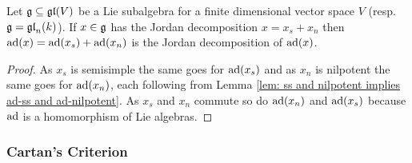 \begin{cor}\label{cor: concrete Jordan decomposition compatible with adjoint representation}
 Let $\mathfrak{g} \subseteq \mathfrak{gl}(V)$ be a Lie subalgebra for a finite dimensional vector space $V$ (resp.\ $\mathfrak{g} = \mathfrak{gl}_n(k)$). If $x \in \mathfrak{g}$ has the Jordan decomposition $x = x_s + x_n$ then $\operatorname{ad}(x) = \operatorname{ad}(x_s) + \operatorname{ad}(x_n)$ is the Jordan decomposition of $\operatorname{ad}(x)$.
\end{cor}
\begin{proof}
 As $x_s$ is semisimple the same goes for $\operatorname{ad}(x_s)$ and as $x_n$ is nilpotent the same goes for $\operatorname{ad}(x_n)$, each following from Lemma \ref{lem: ss and nilpotent implies ad-ss and ad-nilpotent}. As $x_s$ and $x_n$ commute so do $\operatorname{ad}(x_n)$ and $\operatorname{ad}(x_s)$ because $\operatorname{ad}$ is a homomorphism of Lie algebras.
\end{proof}














\subsubsection{Cartan’s Criterion}


